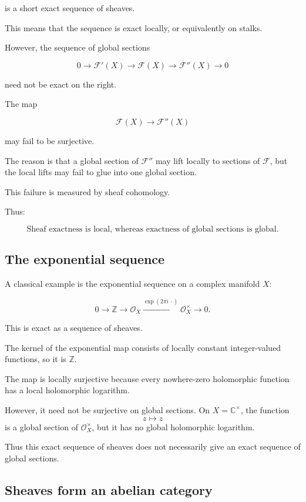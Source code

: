 \documentclass[12pt,a4paper]{article}
\begin{document}
is a short exact sequence of sheaves.

This means that the sequence is exact locally, or equivalently on stalks.

However, the sequence of global sections

\[
0
\longrightarrow
\mathcal F'(X)
\longrightarrow
\mathcal F(X)
\longrightarrow
\mathcal F''(X)
\longrightarrow
0
\]

need not be exact on the right.

The map

\[
\mathcal F(X)\longrightarrow \mathcal F''(X)
\]

may fail to be surjective.

The reason is that a global section of $\mathcal F''$ may lift locally to
sections of $\mathcal F$, but the local lifts may fail to glue into one global
section.

This failure is measured by sheaf cohomology.

Thus:

\[
\boxed{
	\text{Sheaf exactness is local, whereas exactness of global sections is global.}
}
\]

\subsection{The exponential sequence}

A classical example is the exponential sequence on a complex manifold $X$:

\[
0
\longrightarrow
\mathbb Z
\longrightarrow
\mathcal O_X
\xrightarrow{\exp(2\pi i\,\cdot)}
\mathcal O_X^\times
\longrightarrow
0.
\]

This is exact as a sequence of sheaves.

The kernel of the exponential map consists of locally constant integer-valued
functions, so it is $\mathbb Z$.

The map is locally surjective because every nowhere-zero holomorphic function
has a local holomorphic logarithm.

However, it need not be surjective on global sections.
On $X=\mathbb C^\times$, the function
\[
z \mapsto z
\]
is a global section of $\mathcal O_X^\times$, but it has no global holomorphic
logarithm.

Thus this exact sequence of sheaves does not necessarily give an exact sequence
of global sections.

\subsection{Sheaves form an abelian category}
\end{document}
